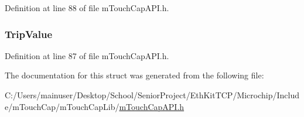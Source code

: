 Definition at line 88 of file m\+Touch\+Cap\+A\+P\+I.\+h.

\hypertarget{struct_m_a_t_r_i_x_k_e_y_abc6bec2968b498197fc0e64c3729fb0c}{}
\subsubsection[{Trip\+Value}]{ Trip\+Value}\label{struct_m_a_t_r_i_x_k_e_y_abc6bec2968b498197fc0e64c3729fb0c}


Definition at line 87 of file m\+Touch\+Cap\+A\+P\+I.\+h.



The documentation for this struct was generated from the following file\+:\begin{DoxyCompactItemize}
\item 
C\+:/\+Users/mainuser/\+Desktop/\+School/\+Senior\+Project/\+Eth\+Kit\+T\+C\+P/\+Microchip/\+Include/m\+Touch\+Cap/m\+Touch\+Cap\+Lib/\hyperlink{m_touch_cap_a_p_i_8h}{m\+Touch\+Cap\+A\+P\+I.\+h}\end{DoxyCompactItemize}
